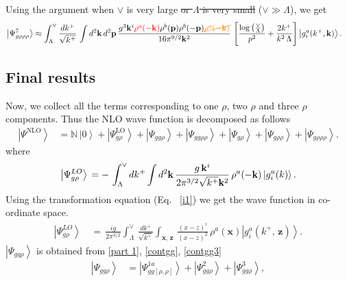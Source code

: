 \documentclass[aps,prd,amsmath,amssymb,nofootinbib]{revtex4-2}
\def\mf#1{\mathbb{#1}}
\numberwithin{equation}{section}
\begin{document}
Using the argument when $\vee$ is very large {\color{orange}\sout{or $\Lambda$ is very small}}{\color{red} ($\vee\gg\Lambda$)}, we get
\begin{align}
     \left|\Psi_{g\rho\rho\rho}^{7}\right\rangle & \approx \int_{\Lambda}^{\vee}\frac{dk^{+}}{\sqrt{k^{+}}}\,\int d^{2}\mathbf{k}\, d^{2}\mathbf{p}\,\frac{g^{3}\mathbf{k}^{i}{\color{red}\rho^{a}(-\mathbf{k})}\rho^{b}(\mathbf{p})\rho^{b}(-\mathbf{p}){\color{orange}\cancel{\rho^{a}(-\mathbf{k})}}}{16\pi^{9/2}\mathbf{k}^{2}}\,\left[\frac{\log{\left(\frac{\vee}{\Lambda}\right)}}{p^{2}}+\frac{2k^{+}}{k^{2}\,\Lambda}\right]\left|g_{i}^{a}(k^{+},\mathbf{k})\right\rangle. 
\end{align}
 \subsection{Final results}
Now, we collect all the terms corresponding to one $\rho$, two $\rho$ and three $\rho$ components. Thus the NLO wave function is decomposed as follows
\begin{align}\label{NLOWF}
\left|\Psi^{\text{NLO}}\right\rangle & = \mf{N}\,\left|0\right\rangle +\left|\Psi_{g\rho}^{\text{LO}}\right\rangle  
+\left|\Psi_{gg\rho}\right\rangle +\left|\Psi_{gg\rho\rho}\right\rangle +\left|\Psi_{g\rho}\right\rangle +\left|\Psi_{g\rho\rho}\right\rangle +
\left|\Psi_{g\rho\rho\rho}\right\rangle .
\end{align}
where
\begin{equation}\label{lowav1mom}
\left|\Psi_{g\rho}^{LO}\right\rangle \,=\- -\,\int_{\Lambda}^{\vee}dk^{+}\int d^{2}\mathbf{k}\,\frac{g\, \mathbf{k}^{i}}{2\pi^{3/2}\sqrt{k^{+}}\mathbf{k}^{2}}\,\rho^{a}(-\mathbf{k})\left|g_{i}^{a}(k)\right\rangle .
\end{equation}
Using the transformation equation (Eq.~ \eqref{i1}) we get the wave function in co-ordinate space.
\begin{align}\label{lowav1}
\left|\Psi_{g\rho}^{LO}\right\rangle \,& =\,\frac{ig}{2\pi^{3/2}}\int_{\Lambda}^{\vee}\,\frac{dk^{+}}{\sqrt{k^{+}}}\int_{\mathbf{x},\, \mathbf{z}}\,\frac{ (x-z)^{i}}{(x-z)^{2}}\,\rho^{a}(\mathbf{x})\left|g_{i}^{a}(k^{+},\, \mathbf{z})\right\rangle .
 \end{align}
$\left|\Psi_{gg\rho}\right\rangle$ is obtained from \eqref{part 1}, \eqref{contgg}, \eqref{contgg3}
\begin{align}
    \left|\Psi_{gg\rho}\right\rangle  & = \left|\Psi^{1a}_{gg[\rho,\rho]}\right\rangle + \left|\Psi^{2}_{gg\rho}\right\rangle + \left|\Psi^{3}_{gg\rho}\right\rangle,
\end{align}
\end{document}
